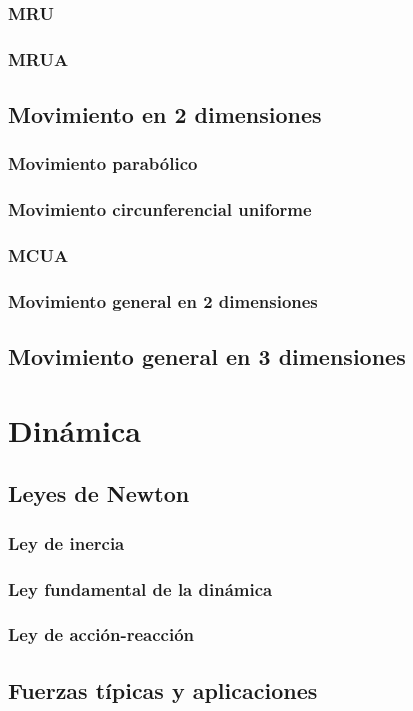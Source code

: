  \subsection{MRU}
  \subsection{MRUA}
 \section{Movimiento en 2 dimensiones}
  \subsection{Movimiento parab\'olico}
  \subsection{Movimiento circunferencial uniforme}
  \subsection{MCUA}
  \subsection{Movimiento general en 2 dimensiones}
  \section{Movimiento general en 3 dimensiones}
\chapter{Dinámica}
 \section{Leyes de Newton}
  \subsection{Ley de inercia}
  \subsection{Ley fundamental de la din\'amica}
  \subsection{Ley de acci\'on-reacci\'on}
  \section{Fuerzas t\'ipicas y aplicaciones}
